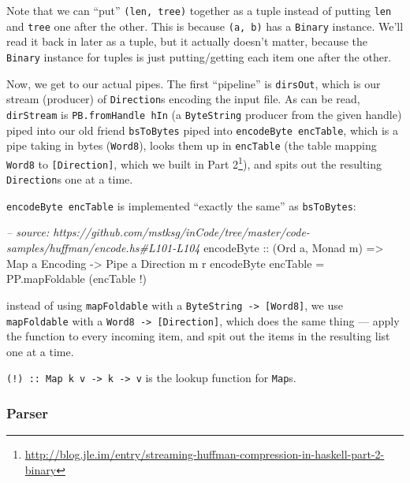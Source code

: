 \documentclass[]{article}
\newenvironment{Shaded}{}{}
\newcommand{\DataTypeTok}[1]{\textcolor[rgb]{0.56,0.13,0.00}{#1}}
\newcommand{\CommentTok}[1]{\textcolor[rgb]{0.38,0.63,0.69}{\textit{#1}}}
\newcommand{\OtherTok}[1]{\textcolor[rgb]{0.00,0.44,0.13}{#1}}
\newcommand{\FunctionTok}[1]{\textcolor[rgb]{0.02,0.16,0.49}{#1}}
\newcommand{\NormalTok}[1]{#1}
\renewcommand{\href}[2]{#2\footnote{\url{#1}}}
\begin{document}
Note that we can ``put'' \texttt{(len,\ tree)} together as a tuple instead of
putting \texttt{len} and \texttt{tree} one after the other. This is because
\texttt{(a,\ b)} has a \texttt{Binary} instance. We'll read it back in later as
a tuple, but it actually doesn't matter, because the \texttt{Binary} instance
for tuples is just putting/getting each item one after the other.

Now, we get to our actual pipes. The first ``pipeline'' is \texttt{dirsOut},
which is our stream (producer) of \texttt{Direction}s encoding the input file.
As can be read, \texttt{dirStream} is \texttt{PB.fromHandle\ hIn} (a
\texttt{ByteString} producer from the given handle) piped into our old friend
\texttt{bsToBytes} piped into \texttt{encodeByte\ encTable}, which is a pipe
taking in bytes (\texttt{Word8}), looks them up in \texttt{encTable} (the table
mapping \texttt{Word8} to \texttt{{[}Direction{]}}, which we built in
\href{http://blog.jle.im/entry/streaming-huffman-compression-in-haskell-part-2-binary}{Part
2}), and spits out the resulting \texttt{Direction}s one at a time.

\texttt{encodeByte\ encTable} is implemented ``exactly the same'' as
\texttt{bsToBytes}:

\begin{Shaded}
\begin{Highlighting}[]
\CommentTok{-- source: https://github.com/mstksg/inCode/tree/master/code-samples/huffman/encode.hs#L101-L104}
\OtherTok{encodeByte ::}\NormalTok{ (}\DataTypeTok{Ord}\NormalTok{ a, }\DataTypeTok{Monad}\NormalTok{ m)}
           \OtherTok{=>} \DataTypeTok{Map}\NormalTok{ a }\DataTypeTok{Encoding}
           \OtherTok{->} \DataTypeTok{Pipe}\NormalTok{ a }\DataTypeTok{Direction}\NormalTok{ m r}
\NormalTok{encodeByte encTable }\FunctionTok{=}\NormalTok{ PP.mapFoldable (encTable }\FunctionTok{!}\NormalTok{)}
\end{Highlighting}
\end{Shaded}

instead of using \texttt{mapFoldable} with a
\texttt{ByteString\ -\textgreater{}\ {[}Word8{]}}, we use \texttt{mapFoldable}
with a \texttt{Word8\ -\textgreater{}\ {[}Direction{]}}, which does the same
thing --- apply the function to every incoming item, and spit out the items in
the resulting list one at a time.

\texttt{(!)\ ::\ Map\ k\ v\ -\textgreater{}\ k\ -\textgreater{}\ v} is the
lookup function for \texttt{Map}s.

\subsubsection{Parser}\label{parser}
\end{document}
